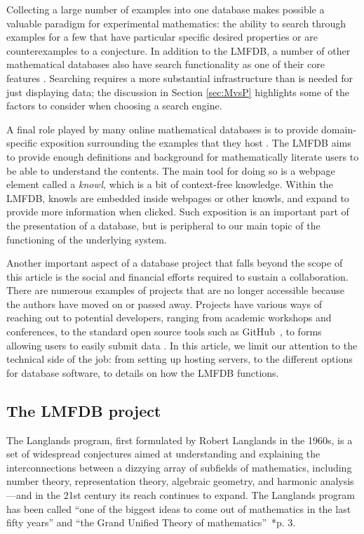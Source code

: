 \documentclass{amsart}
\begin{document}
Collecting a large number of examples into one database makes possible a valuable paradigm for experimental mathematics: the ability to search through examples for a few that have particular specific desired properties or are counterexamples to a conjecture.
In addition to the LMFDB, a number of other mathematical databases also have search functionality as one of their core features \cites{umrk, findstat, oeis, isc, cydata, hog, knotinfo}.
Searching requires a more substantial infrastructure than is needed for just displaying data; the discussion in Section \ref{sec:MvsP} highlights some of the factors to consider when choosing a search engine.

A final role played by many online mathematical databases is to provide domain-specific exposition surrounding the examples that they host \cites{primepages, graphclasses, complexityzoo, cantorsattic, findstat, knotinfo, groupnames}.
The LMFDB aims to provide enough definitions and background for mathematically literate users to be able to understand the contents.
The main tool for doing so is a webpage element called a \emph{knowl}, which is a bit of context-free knowledge.
Within the LMFDB, knowls are embedded inside webpages or other knowls, and expand to provide more information when clicked.
Such exposition is an important part of the presentation of a database, but is peripheral to our main topic of the functioning of the underlying system.

Another important aspect of a database project that falls beyond the scope of this article is the social and financial efforts required to sustain a collaboration.
There are numerous examples of projects that are no longer accessible because the authors have moved on or passed away.
Projects have various ways of reaching out to potential developers, ranging from academic workshops and conferences, to the standard open source tools such as GitHub~\cite{github}, to forms allowing users to easily submit data \cites{findstat, hog, oeis}.
In this article, we limit our attention to the technical side of the job: from setting up hosting servers, to the different options for database software, to details on how the LMFDB functions.




\subsection{The LMFDB project}
The Langlands program, first formulated by Robert Langlands in the 1960s, is a set of widespread conjectures aimed at understanding and explaining the interconnections between a dizzying array of subfields of mathematics, including number theory, representation theory, algebraic geometry, and harmonic analysis---and in the 21st century its reach continues to expand.
The Langlands program has been called ``one of the biggest ideas to come out of mathematics in the last fifty years'' and ``the Grand Unified Theory of mathematics''~\cite{frenkel}*{p. 3}.
\end{document}
